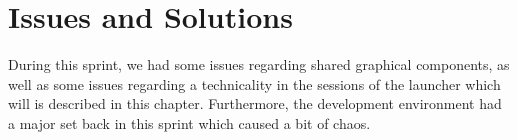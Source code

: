 \chapter{Issues and Solutions}
\label{cha:issues_and_solutions}

During this sprint, we had some issues regarding shared graphical components, as well as some issues regarding a technicality in the sessions of the launcher which will is described in this chapter. Furthermore, the development environment had a major set back in this sprint which caused a bit of chaos.









